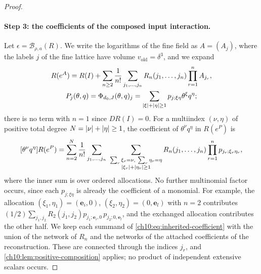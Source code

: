 \begin{proof}
\paragraph{Step 3: the coefficients of the composed input interaction.}
Let $\epsilon=\mathcal B_{\rho,a}(R)$. We write the logarithms of the fine field as $A=(A_j)$, where the labels $j$ of the fine lattice have volume $v_{\mathrm{old}}=\delta^3$, and we expand
\begin{equation}\label{ch10:eq:inherited-expansion}
\begin{gathered}
 R(e^A)=R(I)+\sum_{n\ge2}\frac1{n!}\sum_{j_1,\ldots,j_n}R_n(j_1,\ldots,j_n)\prod_{r=1}^nA_{j_r},\\
 P_j(\theta,q)=\Phi_{d_0,J}(\theta,q)_j=\sum_{\lvert \xi\rvert+\lvert \eta\rvert\ge1}p_{j;\xi\eta}\theta^\xi q^\eta;
\end{gathered}
\end{equation}
there is no term with $n=1$ since $DR(I)=0$. For a multiindex $(\nu,\eta)$ of positive total degree $N=\lvert \nu\rvert+\lvert \eta\rvert\ge1$, the coefficient of $\theta^\nu q^\eta$ in $R(e^P)$ is
\begin{equation}\label{ch10:eq:inherited-coefficient}
 [\theta^\nu q^\eta]R(e^P)=\sum_{n=2}^N\frac1{n!}\sum_{j_1,\ldots,j_n}\ \sum_{\substack{\sum_r\xi_r=\nu,\ \sum_r\eta_r=\eta\\ \abs{\xi_r}+\abs{\eta_r}\ge1}}R_n(j_1,\ldots,j_n)\prod_{r=1}^np_{j_r;\xi_r\eta_r},
\end{equation}
where the inner sum is over ordered allocations. No further multinomial factor occurs, since each $p_{j;\xi\eta}$ is already the coefficient of a monomial. For example, the allocation $(\xi_1,\eta_1)=(\mathbf e_i,0)$, $(\xi_2,\eta_2)=(0,\mathbf e_l)$ with $n=2$ contributes $(1/2)\sum_{j_1,j_2}R_2(j_1,j_2)p_{j_1;\mathbf e_i,0}\,p_{j_2;0,\mathbf e_l}$, and the exchanged allocation contributes the other half. We keep each summand of \eqref{ch10:eq:inherited-coefficient} with the union of the network of $R_n$ and the networks of the attached coefficients of the reconstruction. These are connected through the indices $j_r$, and \cref{ch10:lem:positive-composition} applies; no product of independent extensive scalars occurs.


\end{proof}
